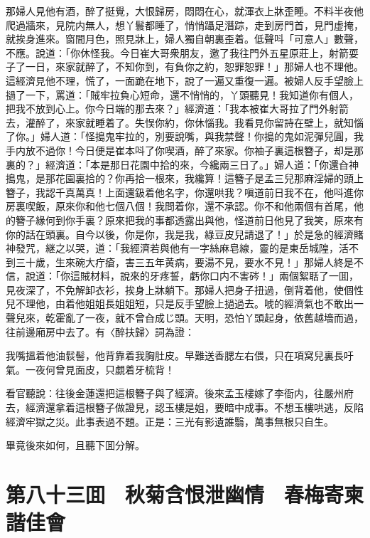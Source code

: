 那婦人見他有酒，醉了挺覺，大恨歸房，悶悶在心，就渾衣上牀歪睡。不料半夜他爬過牆來，見院内無人，想丫鬟都睡了，悄悄躡足潛踪，走到房門首，見門虚掩，就挨身進來。窗間月色，照見牀上，婦人獨自朝裏歪着。低聲呌「可意人」數聲，不應。說道：「你休怪我。今日崔大哥衆朋友，邀了我往門外五星原莊上，射箭耍子了一日，來家就醉了，不知你到，有負你之約，恕罪恕罪！」那婦人也不理他。這經濟見他不理，慌了，一面跪在地下，說了一遍又重復一遍。被婦人反手望臉上撾了一下，罵道：「賊牢拉負心短命，還不悄悄的，丫頭聽見！我知道你有個人，把我不放到心上。你今日端的那去來？」經濟道：「我本被崔大哥拉了門外射箭去，灌醉了，來家就睡着了。失悮你約，你休惱我。我看見你留詩在壁上，就知惱了你。」婦人道：「怪搗鬼牢拉的，別要說嘴，與我禁聲！你搗的鬼如泥彈兒圓，我手内放不過你！今日便是崔本呌了你喫酒，醉了來家。你袖子裏這根簪子，却是那裏的？」經濟道：「本是那日花園中拾的來，今纔兩三日了。」婦人道：「你還㒲神搗鬼，是那花園裏拾的？你再拾一根來，我纔算！這簪子是孟三兒那麻淫婦的頭上簪子，我認千真萬真！上面還鈒着他名字，你還哄我？嗔道前日我不在，他呌進你房裏喫飯，原來你和他七個八個！我問着你，還不承認。你不和他兩個有首尾，他的簪子緣何到你手裏？原來把我的事都透露出與他，怪道前日他見了我笑，原來有你的話在頭裏。自今以後，你是你，我是我，綠豆皮兒請退了！」於是急的經濟賭神發咒，継之以哭，道：「我經濟若與他有一字絲麻皂線，靈的是東岳城隍，活不到三十歲，生來碗大疔瘡，害三五年黄病，要湯不見，要水不見！」那婦人終是不信，說道：「你這賊材料，說來的牙疼誓，虧你口内不害硶！」兩個絮聒了一囬，見夜深了，不免解卸衣衫，挨身上牀躺下。那婦人把身子扭過，倒背着他，使個性兒不理他，由着他姐姐長姐姐短，只是反手望臉上撾過去。唬的經濟氣也不敢出一聲兒來，乾霍亂了一夜，就不曾㒲成じ頭。天明，恐怕丫頭起身，依舊越墻而過，往前邊廂房中去了。有〈醉扶歸〉詞為證：

我嘴搵着他油䯼髻，他背靠着我胸肚皮。早難送香腮左右偎，只在項窝兒裏長吁氣。一夜何曾見面皮，只覷着牙梳背！

看官聽說：往後金蓮還把這根簪子與了經濟。後來孟玉樓嫁了李衙内，往嚴州府去，經濟還拿着這根簪子做證見，認玉樓是姐，要暗中成事。不想玉樓哄逃，反陷經濟牢獄之災。此事表過不題。正是：三光有影遺誰翳，萬事無根只自生。

畢竟後來如何，且聽下囬分解。

\chapter*{第八十三囬　秋菊含恨泄幽情　春梅寄柬諧佳會}

